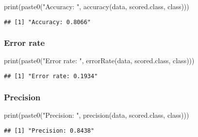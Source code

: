 \documentclass[
]{article}
\newenvironment{Shaded}{\begin{snugshade}}{\end{snugshade}}
\newcommand{\FunctionTok}[1]{\textcolor[rgb]{0.00,0.00,0.00}{#1}}
\newcommand{\NormalTok}[1]{#1}
\newcommand{\StringTok}[1]{\textcolor[rgb]{0.31,0.60,0.02}{#1}}
\begin{document}
\begin{Shaded}
\begin{Highlighting}[]
\FunctionTok{print}\NormalTok{(}\FunctionTok{paste0}\NormalTok{(}\StringTok{"Accuracy: "}\NormalTok{, }\FunctionTok{accuracy}\NormalTok{(data, }\StringTok{\textquotesingle{}scored.class\textquotesingle{}}\NormalTok{, }\StringTok{\textquotesingle{}class\textquotesingle{}}\NormalTok{)))}
\end{Highlighting}
\end{Shaded}

\begin{verbatim}
## [1] "Accuracy: 0.8066"
\end{verbatim}

\hypertarget{error-rate}{%
\subsubsection{Error rate}\label{error-rate}}

\begin{Shaded}
\begin{Highlighting}[]
\FunctionTok{print}\NormalTok{(}\FunctionTok{paste0}\NormalTok{(}\StringTok{"Error rate: "}\NormalTok{, }\FunctionTok{errorRate}\NormalTok{(data, }\StringTok{\textquotesingle{}scored.class\textquotesingle{}}\NormalTok{, }\StringTok{\textquotesingle{}class\textquotesingle{}}\NormalTok{)))}
\end{Highlighting}
\end{Shaded}

\begin{verbatim}
## [1] "Error rate: 0.1934"
\end{verbatim}

\hypertarget{precision}{%
\subsubsection{Precision}\label{precision}}

\begin{Shaded}
\begin{Highlighting}[]
\FunctionTok{print}\NormalTok{(}\FunctionTok{paste0}\NormalTok{(}\StringTok{"Precision: "}\NormalTok{, }\FunctionTok{precision}\NormalTok{(data, }\StringTok{\textquotesingle{}scored.class\textquotesingle{}}\NormalTok{, }\StringTok{\textquotesingle{}class\textquotesingle{}}\NormalTok{)))}
\end{Highlighting}
\end{Shaded}

\begin{verbatim}
## [1] "Precision: 0.8438"
\end{verbatim}
\end{document}
